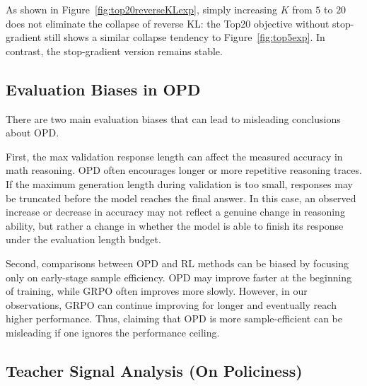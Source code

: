 As shown in Figure~\ref{fig:top20reverseKLexp}, simply increasing $K$ from $5$ to $20$ does not eliminate the collapse of reverse KL: the Top20 objective without stop-gradient still shows a similar collapse tendency to Figure~\ref{fig:top5exp}. In contrast, the stop-gradient version remains stable.

\subsection{Evaluation Biases in OPD}

There are two main evaluation biases that can lead to misleading conclusions
about OPD.

First, the max validation response length can affect the
measured accuracy in math reasoning. OPD often encourages longer
or more repetitive reasoning traces. If the maximum generation length during
validation is too small, responses may be truncated before the model
reaches the final answer. In this case, an observed increase or decrease in
accuracy may not reflect a genuine change in reasoning ability, but rather a
change in whether the model is able to finish its response under the evaluation
length budget.

Second, comparisons between OPD and RL methods can be biased by
focusing only on early-stage sample efficiency. OPD may improve faster at the
beginning of training, while GRPO often improves more
slowly. However, in our observations, GRPO can continue improving for longer and
eventually reach higher performance. Thus, claiming that OPD is
more sample-efficient can be misleading if one ignores the performance ceiling.



\subsection{Teacher Signal Analysis (On Policiness)}



